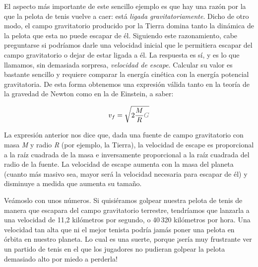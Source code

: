 El aspecto más importante de este sencillo ejemplo es que hay una razón por la que la pelota de tenis vuelve a caer: está \emph{ligada gravitatoriamente}. Dicho de otro modo, el campo gravitatorio producido por la Tierra domina tanto la dinámica de la pelota que esta no puede escapar de él. Siguiendo este razonamiento, cabe preguntarse si podríamos darle una velocidad inicial que le permitiera escapar del campo gravitatorio o dejar de estar ligada a él. La respuesta es sí, y es lo que llamamos, sin demasiada sorpresa, \emph{velocidad de escape}. Calcular su valor es bastante sencillo y requiere comparar la energía cinética con la energía potencial gravitatoria. De esta forma obtenemos una expresión válida tanto en la teoría de la gravedad de Newton como en la de Einstein, a saber:

\begin{equation}\label{eq:06-02}
v_{f}=\sqrt{2\frac{M}{R}\textcolor{gray}{G}}
\end{equation}

La expresión anterior nos dice que, dada una fuente de campo gravitatorio con masa \emph{M} y radio \emph{R} (por ejemplo, la Tierra), la velocidad de escape es proporcional a la raíz cuadrada de la masa e inversamente proporcional a la raíz cuadrada del radio de la fuente. La velocidad de escape aumenta con la masa del planeta (cuanto más masivo sea, mayor será la velocidad necesaria para escapar de él) y disminuye a medida que aumenta su tamaño.

Veámoslo con unos números. Si quisiéramos golpear nuestra pelota de tenis de manera que escapara del campo gravitatorio terrestre, tendríamos que lanzarla a una velocidad de 11,2 kilómetros por segundo, o 40\,320 kilómetros por hora. Una velocidad tan alta que ni el mejor tenista podría jamás poner una pelota en órbita en nuestro planeta. Lo cual es una suerte, porque ¡sería muy frustrante ver un partido de tenis en el que los jugadores no pudieran golpear la pelota demasiado alto por miedo a perderla!


